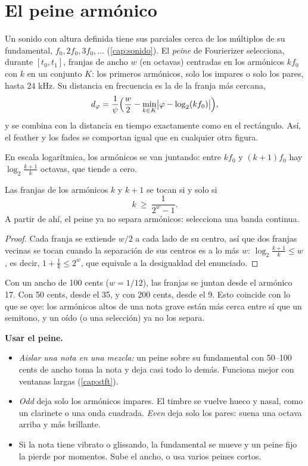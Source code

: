 \section{El peine armónico}

Un sonido con altura definida tiene sus parciales cerca de los múltiplos de su fundamental,
$f_0,2f_0,3f_0,\dots$ (\cref{cap:sonido}). El \emph{peine} de Fourierizer selecciona, durante
$[t_0,t_1]$, franjas de ancho $w$ (en octavas) centradas en los armónicos $k f_0$ con $k$ en un
conjunto $K$: los primeros armónicos, solo los impares o solo los pares, hasta $24$ kHz. Su
distancia en frecuencia es la de la franja más cercana,
\[
  d_\varphi=\frac{1}{\psi}\Bigl(\frac w2-\min_{k\in K}\bigl|\varphi-\log_2(kf_0)\bigr|\Bigr),
\]
y se combina con la distancia en tiempo exactamente como en el rectángulo. Así, el feather y los
fades se comportan igual que en cualquier otra figura.

En escala logarítmica, los armónicos se van juntando: entre $k f_0$ y $(k+1)f_0$ hay
$\log_2\frac{k+1}{k}$ octavas, que tiende a cero.

\begin{proposicion}
Las franjas de los armónicos $k$ y $k+1$ se tocan si y solo si
\[
  k\ \ge\ \frac{1}{2^{w}-1}.
\]
A partir de ahí, el peine ya no separa armónicos: selecciona una banda continua.
\end{proposicion}

\begin{proof}
Cada franja se extiende $w/2$ a cada lado de su centro, así que dos franjas vecinas se tocan cuando
la separación de sus centros es a lo más $w$: $\log_2\frac{k+1}{k}\le w$, es decir,
$1+\frac1k\le 2^w$, que equivale a la desigualdad del enunciado.
\end{proof}

Con un ancho de 100 cents ($w=1/12$), las franjas se juntan desde el armónico 17. Con 50 cents,
desde el 35, y con 200 cents, desde el 9. Esto coincide con lo que se oye: los armónicos altos de
una nota grave están más cerca entre sí que un semitono, y un oído (o una selección) ya no los
separa.

\begin{estudio}
\textbf{Usar el peine.}
\begin{itemize}
  \item \emph{Aislar una nota en una mezcla:} un peine sobre su fundamental con 50--100 cents de
        ancho toma la nota y deja casi todo lo demás. Funciona mejor con ventanas largas
        (\cref{cap:stft}).
  \item \emph{Odd} deja solo los armónicos impares. El timbre se vuelve hueco y nasal, como un
        clarinete o una onda cuadrada. \emph{Even} deja solo los pares: suena una octava arriba y
        más brillante.
  \item Si la nota tiene vibrato o glissando, la fundamental se mueve y un peine fijo la pierde por
        momentos. Sube el ancho, o usa varios peines cortos.
\end{itemize}
\end{estudio}

